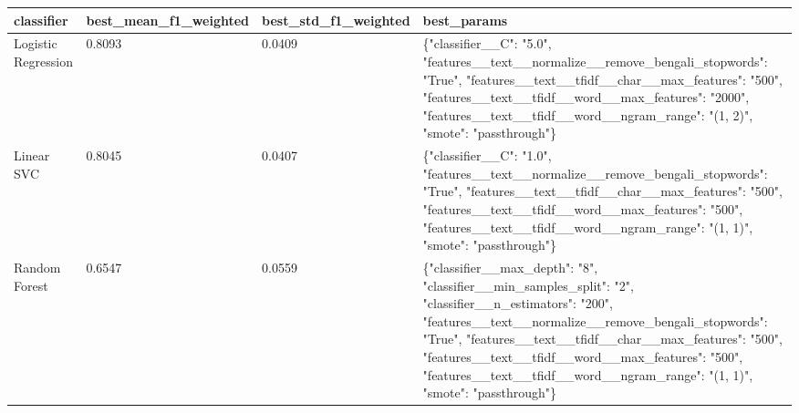 \begin{tabular}{llll}
\toprule
classifier & best\_mean\_f1\_weighted & best\_std\_f1\_weighted & best\_params \\
\midrule
Logistic Regression & 0.8093 & 0.0409 & \{"classifier\_\_C": "5.0", "features\_\_text\_\_normalize\_\_remove\_bengali\_stopwords": "True", "features\_\_text\_\_tfidf\_\_char\_\_max\_features": "500", "features\_\_text\_\_tfidf\_\_word\_\_max\_features": "2000", "features\_\_text\_\_tfidf\_\_word\_\_ngram\_range": "(1, 2)", "smote": "passthrough"\} \\
Linear SVC & 0.8045 & 0.0407 & \{"classifier\_\_C": "1.0", "features\_\_text\_\_normalize\_\_remove\_bengali\_stopwords": "True", "features\_\_text\_\_tfidf\_\_char\_\_max\_features": "500", "features\_\_text\_\_tfidf\_\_word\_\_max\_features": "500", "features\_\_text\_\_tfidf\_\_word\_\_ngram\_range": "(1, 1)", "smote": "passthrough"\} \\
Random Forest & 0.6547 & 0.0559 & \{"classifier\_\_max\_depth": "8", "classifier\_\_min\_samples\_split": "2", "classifier\_\_n\_estimators": "200", "features\_\_text\_\_normalize\_\_remove\_bengali\_stopwords": "True", "features\_\_text\_\_tfidf\_\_char\_\_max\_features": "500", "features\_\_text\_\_tfidf\_\_word\_\_max\_features": "500", "features\_\_text\_\_tfidf\_\_word\_\_ngram\_range": "(1, 1)", "smote": "passthrough"\} \\
\bottomrule
\end{tabular}
